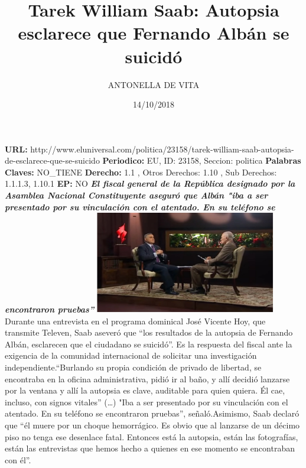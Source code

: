 \documentclass{article}%
\title{\textbf{Tarek William Saab: Autopsia esclarece que Fernando Albán se suicidó}}%
\author{ANTONELLA DE VITA}%
\date{14/10/2018}%
\begin{document}
%
\normalsize%
\maketitle%
\textbf{URL: }%
http://www.eluniversal.com/politica/23158/tarek{-}william{-}saab{-}autopsia{-}de{-}esclarece{-}que{-}se{-}suicido\newline%
%
\textbf{Periodico: }%
EU, %
ID: %
23158, %
Seccion: %
politica\newline%
%
\textbf{Palabras Claves: }%
NO\_TIENE\newline%
%
\textbf{Derecho: }%
1.1%
, Otros Derechos: %
1.10%
, Sub Derechos: %
1.1.1.3, 1.10.1%
\newline%
%
\textbf{EP: }%
NO\newline%
\newline%
%
\textbf{\textit{El fiscal general de la República designado por la Asamblea Nacional Constituyente aseguró que Albán "iba a ser presentado por su vinculación con el atentado. En su teléfono se encontraron pruebas”}}%
\newline%
\newline%
%
\includegraphics[width=300px]{153.jpg}%
\newline%
%
Durante una entrevista en el programa dominical José Vicente Hoy, que transmite Televen, Saab aseveró que “los resultados de la autopsia de Fernando Albán, esclarecen que el ciudadano se suicidó”. Es la respuesta del fiscal ante la exigencia de la comunidad internacional de solicitar una investigación independiente.“Burlando su propia condición de privado de libertad, se encontraba en la oficina administrativa, pidió ir al baño, y allí decidió lanzarse por la ventana y allí la autopsia es clave, auditable para quien  quiera. Él cae, incluso, con signos vitales” (…) "Iba a ser presentado por su vinculación con el atentado. En su teléfono se encontraron pruebas”, señaló.Asimismo, Saab declaró que “él muere por un choque hemorrágico. Es obvio que al lanzarse de un décimo piso no tenga ese desenlace fatal. Entonces está la autopsia, están las fotografías, están las entrevistas que hemos hecho a quienes en ese momento se encontraban con él”.%
\newline%
%
\end{document}
